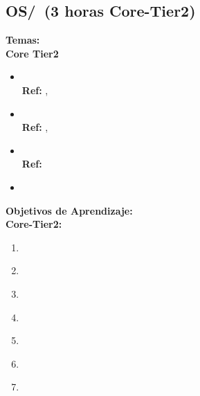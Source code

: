 \subsection{OS/\OSSchedulingandDispatch~(3 horas Core-Tier2)}\label{sec:BOK:OSSchedulingandDispatch}
\noindent \textbf{Temas:}\\
\noindent \textbf{Core Tier2}
\begin{itemize}
	\item \OSSchedulingandDispatchTopicPreemptive\xspace \\ \textbf{Ref:} , \label{sec:BOK:OSSchedulingandDispatchTopicPreemptive}
	\item \OSSchedulingandDispatchTopicSchedulers\xspace \\ \textbf{Ref:} , \label{sec:BOK:OSSchedulingandDispatchTopicSchedulers}
	\item \OSSchedulingandDispatchTopicProcesses\xspace \\ \textbf{Ref:} \label{sec:BOK:OSSchedulingandDispatchTopicProcesses}
	\item \OSSchedulingandDispatchTopicDeadlines\label{sec:BOK:OSSchedulingandDispatchTopicDeadlines}
\end{itemize}


\noindent \textbf{Objetivos de Aprendizaje:}\\
\noindent \textbf{Core-Tier2:}
\begin{enumerate}
	\setcounter{enumi}{0}
	\item \OSSchedulingandDispatchLOCompareAndCommon\xspace[\OSSchedulingandDispatchLOCompareAndCommonLevel]\label{sec:BOK:OSSchedulingandDispatchLOCompareAndCommon}
	\item \OSSchedulingandDispatchLODescribeRelationships\xspace[\OSSchedulingandDispatchLODescribeRelationshipsLevel]\label{sec:BOK:OSSchedulingandDispatchLODescribeRelationships}
	\item \OSSchedulingandDispatchLODiscussTheProcessor\xspace[\OSSchedulingandDispatchLODiscussTheProcessorLevel]\label{sec:BOK:OSSchedulingandDispatchLODiscussTheProcessor}
	\item \OSSchedulingandDispatchLODescribeTheProcesses\xspace[\OSSchedulingandDispatchLODescribeTheProcessesLevel]\label{sec:BOK:OSSchedulingandDispatchLODescribeTheProcesses}
	\item \OSSchedulingandDispatchLOCompareAndAndTo\xspace[\OSSchedulingandDispatchLOCompareAndAndToLevel]\label{sec:BOK:OSSchedulingandDispatchLOCompareAndAndTo}
	\item \OSSchedulingandDispatchLODiscussThePreemption\xspace[\OSSchedulingandDispatchLODiscussThePreemptionLevel]\label{sec:BOK:OSSchedulingandDispatchLODiscussThePreemption}
	\item \OSSchedulingandDispatchLOIdentifyWays\xspace[\OSSchedulingandDispatchLOIdentifyWaysLevel]\label{sec:BOK:OSSchedulingandDispatchLOIdentifyWays}
\end{enumerate}


